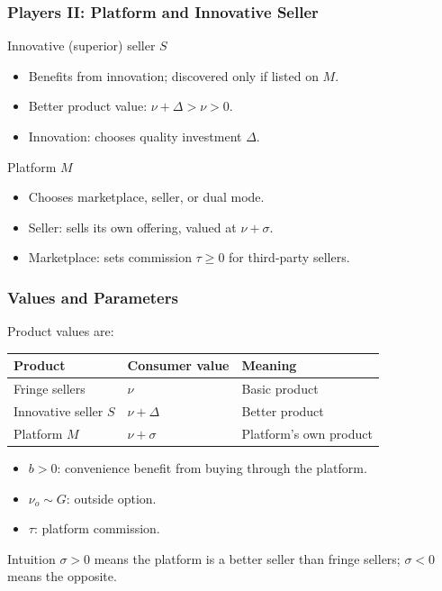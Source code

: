 \begin{frame}
  \frametitle{Players II: Platform and Innovative Seller}
  \small

  \begin{block}{Innovative (superior) seller $S$}
    \begin{itemize}
      \item Benefits from innovation; discovered only if listed on $M$.
      \item Better product value: $\nu+\Delta>\nu>0$.
      \item Innovation: chooses quality investment $\Delta$.
    \end{itemize}
  \end{block}

  \begin{block}{Platform $M$}
    \begin{itemize}
      \item Chooses marketplace, seller, or dual mode.
      \item Seller: sells its own offering, valued at $\nu+\sigma$.
      \item Marketplace: sets commission $\tau \geq 0$ for third-party sellers.
    \end{itemize}
  \end{block}

  
\end{frame}

\begin{frame}
  \frametitle{Values and Parameters}
  \small
  Product values are:

  \begin{center}
    \begin{tabular}{lll}
      \toprule
      Product & Consumer value & Meaning \\
      \midrule
      Fringe sellers & $\nu$ & Basic product \\
      Innovative seller $S$ & $\nu+\Delta$ & Better product \\
      Platform $M$ & $\nu+\sigma$ & Platform's own product \\
      \bottomrule
    \end{tabular}
  \end{center}

  \begin{itemize}
    \item $b>0$: convenience benefit from buying through the platform.
    \item $\nu_o \sim G$: outside option.
    \item $\tau$: platform commission.
  \end{itemize}

  \begin{block}{Intuition}
    $\sigma>0$ means the platform is a better seller than fringe sellers; $\sigma<0$ means the opposite.
  \end{block}
\end{frame}

